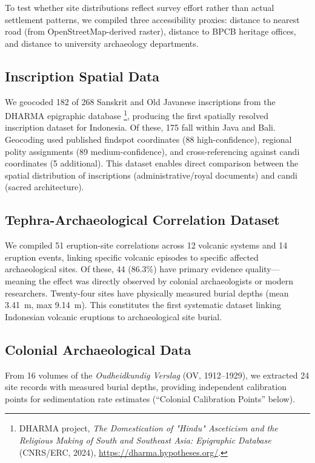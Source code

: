 \documentclass[12pt,a4paper]{article}
\begin{document}
To test whether site distributions reflect survey effort rather than actual settlement patterns, we compiled three accessibility proxies: distance to nearest road (from OpenStreetMap-derived raster), distance to BPCB heritage offices, and distance to university archaeology departments.

\subsection{Inscription Spatial Data}

We geocoded 182 of 268 Sanskrit and Old Javanese inscriptions from the DHARMA epigraphic database \footnote{DHARMA project, \emph{The Domestication of "Hindu" Asceticism and the Religious Making of South and Southeast Asia: Epigraphic Database} (CNRS/ERC, 2024), \url{https://dharma.hypotheses.org/}.}, producing the first spatially resolved inscription dataset for Indonesia. Of these, 175 fall within Java and Bali. Geocoding used published findspot coordinates (88 high-confidence), regional polity assignments (89 medium-confidence), and cross-referencing against candi coordinates (5 additional). This dataset enables direct comparison between the spatial distribution of inscriptions (administrative/royal documents) and candi (sacred architecture).

\subsection{Tephra-Archaeological Correlation Dataset}

We compiled 51 eruption-site correlations across 12 volcanic systems and 14 eruption events, linking specific volcanic episodes to specific affected archaeological sites. Of these, 44 (86.3\%) have primary evidence quality---meaning the effect was directly observed by colonial archaeologists or modern researchers. Twenty-four sites have physically measured burial depths (mean 3.41~m, max 9.14~m). This constitutes the first systematic dataset linking Indonesian volcanic eruptions to archaeological site burial.

\subsection{Colonial Archaeological Data}

From 16 volumes of the \emph{Oudheidkundig Verslag} (OV, 1912--1929), we extracted 24 site records with measured burial depths, providing independent calibration points for sedimentation rate estimates (``Colonial Calibration Points'' below).
\end{document}
